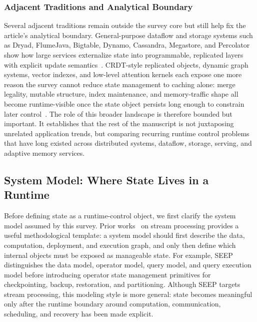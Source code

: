 \documentclass[acmsmall,screen,review]{acmart}
\begin{document}
\subsubsection{Adjacent Traditions and Analytical Boundary}

Several adjacent traditions remain outside the survey core but still help fix the article's analytical boundary. General-purpose dataflow and storage systems such as Dryad, FlumeJava, Bigtable, Dynamo, Cassandra, Megastore, and Percolator show how large services externalize state into programmable, replicated layers with explicit update semantics~\cite{isard2007dryad,chambers2010flumejava,murray2011ciel,chang2008bigtable,decandia2007dynamo,lakshman2010cassandra,baker2011megastore,peng2010percolator}. CRDT-style replicated objects, dynamic graph systems, vector indexes, and low-level attention kernels each expose one more reason the survey cannot reduce state management to caching alone: merge legality, mutable structure, index maintenance, and memory-traffic shape all become runtime-visible once the state object persists long enough to constrain later control~\cite{shapiro2011crdt,gao2026grace,karpukhin2020dpr,khattab2020colbert,jegou2011pq,malkov2020hnsw,dao2024flashattention2}. The role of this broader landscape is therefore bounded but important. It establishes that the rest of the manuscript is not juxtaposing unrelated application trends, but comparing recurring runtime control problems that have long existed across distributed systems, dataflow, storage, serving, and adaptive memory services.


\subsection{System Model: Where State Lives in a Runtime}

Before defining state as a runtime-control object, we first clarify the system model assumed by this survey. Prior works~\cite{fernandez2010seep, mao2025spacker, carbone2015flink} on stream processing provides a useful methodological template: a system model should first describe the data, computation, deployment, and execution graph, and only then define which internal objects must be exposed as manageable state. For example, SEEP~\cite{fernandez2013osm} distinguishes the data model, operator model, query model, and query execution model before introducing operator state management primitives for checkpointing, backup, restoration, and partitioning. Although SEEP targets stream processing, this modeling style is more general: state becomes meaningful only after the runtime boundary around computation, communication, scheduling, and recovery has been made explicit.
\end{document}

